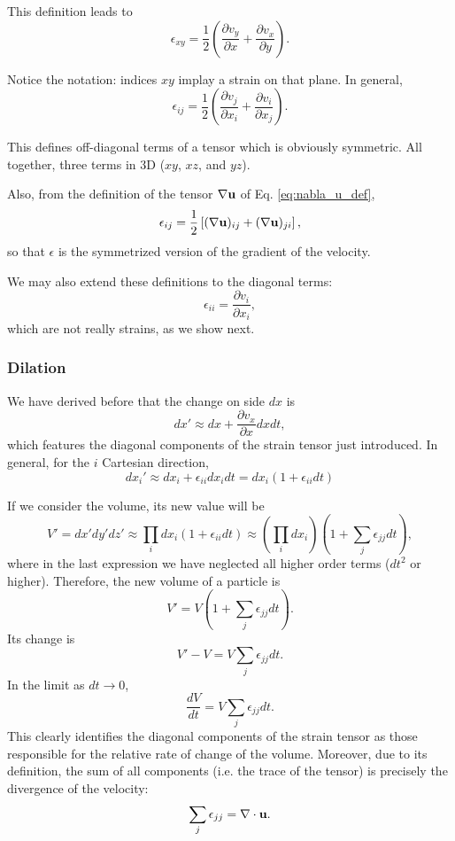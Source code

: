 This definition leads to
\[
\epsilon_{xy} = \frac12
\left(
  \frac{\partial v_y}{\partial x}  +
  \frac{\partial v_x}{\partial y}
\right) .
\]

Notice the notation: indices $xy$ implay a strain on that plane. In general,
\[
\epsilon_{ij} = \frac12
\left(
  \frac{\partial v_j}{\partial x_i}  +
  \frac{\partial v_i}{\partial x_j}
\right) .
\]

This defines off-diagonal terms of a tensor which is obviously
symmetric. All together, three terms in 3D ($xy$, $xz$, and $yz$).

Also, from the definition of the tensor $\nabla \mathbf{u}$ of
Eq. \ref{eq:nabla_u_def},
\begin{equation}
  \label{eq:epsilon_as_grad_u}
  \epsilon_{ij} = \frac12
  \left[
    (\nabla \mathbf{u})_{ij} +
    (\nabla \mathbf{u})_{ji}
  \right] ,
\end{equation}
so that $\epsilon$ is the symmetrized version of the gradient of the
velocity.

We may also extend these definitions to the diagonal terms:
\[
  \epsilon_{ii} =   \frac{\partial v_i}{\partial x_i} ,
\]
which are not really strains, as we show next.

\subsubsection{Dilation}

We have derived before that the change on side $dx$ is
\[
dx' \approx  dx + \frac{\partial v_x}{\partial x} dx dt ,
\]
which features the diagonal components of the strain tensor just
introduced. In general, for the $i$ Cartesian direction,
\[
dx_i' \approx dx_i + \epsilon_{ii} dx_i dt = dx_i
\left(
1+\epsilon_{ii} dt
\right)
\]

If we consider the volume, its new value will be
\[
V'= dx' dy' dz'  \approx  \prod_i  dx_i \left( 1+\epsilon_{ii} dt \right)
\approx \left(\prod_i  dx_i \right) \left( 1 + \sum_j  \epsilon_{jj} dt \right) ,
\]
where in the last expression we have neglected all higher order terms
($dt^2$ or higher). Therefore, the new volume of a particle is
\[
V' = V \left( 1 + \sum_j  \epsilon_{jj} dt \right) .
\]
Its change is
\[
V'-V =  V \sum_j  \epsilon_{jj} dt .
\]
In the limit as $dt\to 0$,
\[
\frac{d V}{dt} = V \sum_j  \epsilon_{jj} dt .
\]
This clearly identifies the diagonal components of the strain tensor
as those responsible for the relative rate of change of the volume.
Moreover, due to its definition, the sum of all components (i.e. the
trace of the tensor) is precisely the divergence of the velocity:
\[
\sum_j  \epsilon_{jj} = \nabla\cdot \mathbf{u} .
\]

